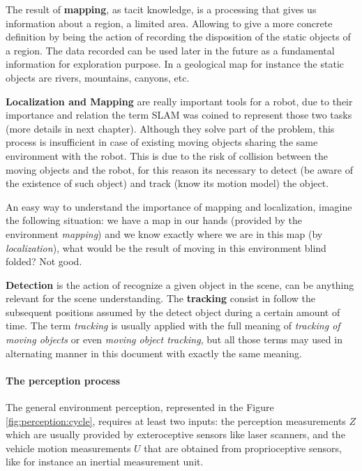 The result of \textbf{mapping}, as tacit knowledge, is a processing that gives us information about a region, a limited area. Allowing to give a more concrete definition by being the action of recording the disposition of the static objects of a region. The data recorded can be used later in the future as a fundamental information for exploration purpose. In a geological map for instance the static objects are rivers, mountains, canyons, etc. 

\textbf{Localization and Mapping} are really important tools for a robot, due to their importance and relation the term SLAM was coined to represent those two tasks (more details in next chapter). Although they solve part of the problem, this process is insufficient in case of existing moving objects sharing the same environment with the robot. This is due to the risk of collision between the moving objects and the robot, for this reason its necessary to detect (be aware of the existence of such object) and track (know its motion model) the object.

An easy way to understand the importance of mapping and localization, imagine the following situation: we have a map in our hands (provided by the environment \textit{mapping}) and we know exactly where we are in this map (by \textit{localization}), what would be the result of moving in this environment blind folded? Not good.

\textbf{Detection} is the action of recognize a given object in the scene, can be anything relevant for the scene understanding. The \textbf{tracking} consist in follow the subsequent positions assumed by the detect object during a certain amount of time. The term \textit{tracking} is usually applied with the full meaning of \textit{tracking of moving objects}\cite{Wang04a} or even \textit{moving object tracking}, but all those terms may used in alternating manner in this document with exactly the same meaning.

\paragraph{The perception process} The general environment perception, represented in the Figure \ref{fig:perception:cycle}, requires at least two inputs: the perception measurements $Z$ which are usually provided by exteroceptive sensors like laser scanners, and the vehicle motion measurements $U$ that are obtained from proprioceptive sensors, like for instance an inertial measurement unit.

